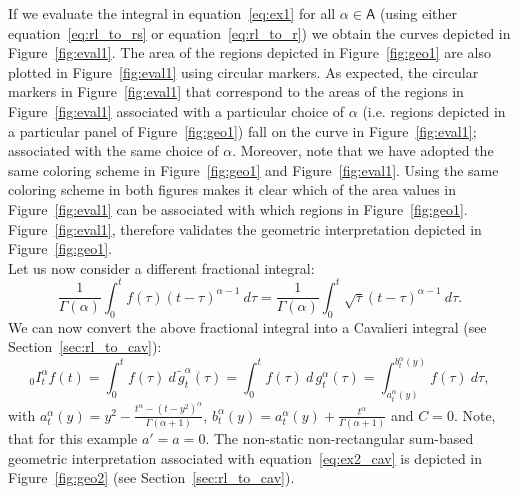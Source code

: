 \documentclass[twoside,reqno,11pt]{fcaa-var} %
\begin{document}
\noindent
If we evaluate the integral in equation~\eqref{eq:ex1} for all $\alpha\in \mathsf{A}$ (using either equation~\eqref{eq:rl_to_rs} or equation~\eqref{eq:rl_to_r}) we obtain the curves depicted in Figure~\ref{fig:eval1}. The area of the regions depicted in Figure~\ref{fig:geo1} are also plotted in Figure~\ref{fig:eval1} using circular markers. As expected, the circular markers in Figure~\ref{fig:eval1} that correspond to the areas of the regions in Figure~\ref{fig:eval1} associated with a particular choice of $\alpha$ (i.e. regions depicted in a particular panel of Figure~\ref{fig:geo1}) fall on the curve in Figure~\ref{fig:eval1}; associated with the same choice of $\alpha$. Moreover, note that we have adopted the same coloring scheme in Figure~\ref{fig:geo1} and Figure~\ref{fig:eval1}. Using the same coloring scheme in both figures makes it clear which of the area values in Figure~\ref{fig:eval1} can be associated with which regions in Figure~\ref{fig:geo1}. Figure~\ref{fig:eval1}, therefore validates the geometric interpretation depicted in Figure~\ref{fig:geo1}. \\

\noindent
Let us now consider a different fractional integral:
\begin{equation}
\label{eq:ex2}
\frac{1}{\Gamma(\alpha)}\int_0^t f(\tau) (t-\tau)^{\alpha-1}~d\tau = \frac{1}{\Gamma(\alpha)}\int_0^t \sqrt{\tau}(t-\tau)^{\alpha-1}~d\tau. 
\end{equation}
We can now convert the above fractional integral into a Cavalieri integral (see Section~\ref{sec:rl_to_cav}):
\begin{equation}
\label{eq:ex2_cav}
_0I_t^{\alpha} f(t) = \int_0^t f(\tau)~d\,\widetilde{g}_t^{\alpha}(\tau)=\int_0^t f(\tau)~d\,g_t^{\alpha}(\tau)=\int_{a_t^{\alpha}(y)}^{b_t^{\alpha}(y)} f(\tau)~d\tau,
\end{equation}
with $a_t^{\alpha}(y) = y^2 - \frac{t^{\alpha}-(t-y^2)^{\alpha}}{\Gamma(\alpha+1)}$, $b_t^{\alpha}(y) = a_t^{\alpha}(y) + \frac{t^{\alpha}}{\Gamma(\alpha+1)}$ and $C=0$.
Note, that for this example $a'=a=0$. The non-static non-rectangular sum-based geometric interpretation associated with equation~\ref{eq:ex2_cav} is depicted in Figure~\ref{fig:geo2} (see Section~\ref{sec:rl_to_cav}).
\end{document}
